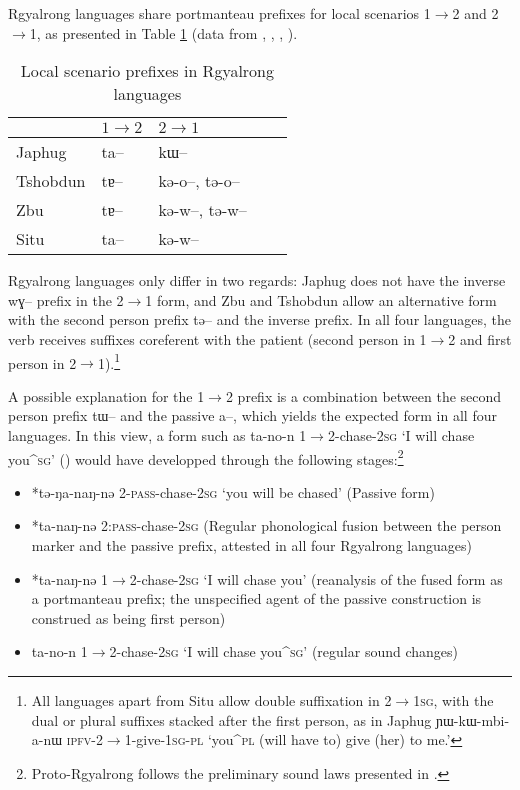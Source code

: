 \documentclass[oldfontcommands,oneside,a4paper,11pt]{article}
\newcommand{\ipa}[1]{{\phon \mbox{#1}}} %
\begin{document}
Rgyalrong languages share portmanteau prefixes for local scenarios 1$\rightarrow$2 and 2$\rightarrow$1, as presented in Table \ref{tab:local.rgy} (data from \citealt[218]{linxr93jiarong}, \citealt{jackson02rentongdengdi}, \citealt{jacques12agreement}, \citealt{gongxun14agreement}).

\begin{table}
\caption{Local scenario prefixes in Rgyalrong languages} \centering \label{tab:local.rgy} 
\begin{tabular}{lllll}
\toprule
& $1\rightarrow2$ & $2\rightarrow1$ \\
\midrule
Japhug &  \ipa{ta--} & \ipa{kɯ--} \\
Tshobdun &  \ipa{tɐ--} & \ipa{kə-o--}, \ipa{tə-o--} \\
Zbu &  \ipa{tɐ--} &\ipa{kə-w--}, \ipa{tə-w--} \\
Situ &  \ipa{ta--} & \ipa{kə-w--} \\
\bottomrule
\end{tabular}
\end{table}

Rgyalrong languages only differ in two regards: Japhug does not have the inverse \ipa{wɣ--} prefix in the  2$\rightarrow$1 form, and Zbu and Tshobdun allow an alternative form with the second person prefix \ipa{tə--} and the inverse prefix. In all four languages, the verb receives suffixes coreferent with the patient (second person in 1$\rightarrow$2 and first person in  2$\rightarrow$1).\footnote{All languages apart from Situ allow double suffixation in 2$\rightarrow$\textsc{1sg}, with the dual or plural suffixes stacked after the first person, as in Japhug \ipa{ɲɯ-kɯ-mbi-a-nɯ} \textsc{ipfv}-2$\rightarrow$1-give-\textsc{1sg-pl} `you^{\textsc{pl}} (will have to) give (her) to me.'}

A possible explanation for the 1$\rightarrow$2  prefix is a combination between the second person prefix \ipa{tɯ--} and the passive \ipa{a--}, which yields the expected form in all four languages. In this view, a form such as \ipa{ta-no-n} 1$\rightarrow$2-chase-\textsc{2sg} `I will chase you^{\textsc{sg}}' (\citealt[219]{linxr93jiarong}) would have developped through the following stages:\footnote{Proto-Rgyalrong follows the preliminary sound laws presented in \citet{jacques04these}.}

\begin{itemize}
\item *\ipa{tə-ŋa-naŋ-nə}  2-\textsc{pass}-chase-\textsc{2sg} `you will be chased' (Passive form)
\item *\ipa{ta-naŋ-nə}  2:\textsc{pass}-chase-\textsc{2sg} (Regular phonological fusion between the person marker and the passive prefix, attested in all four Rgyalrong languages)  
\item  *\ipa{ta-naŋ-nə}  1$\rightarrow$2-chase-\textsc{2sg} `I will chase you' (reanalysis of the fused form as a portmanteau prefix; the unspecified agent of the passive construction is construed as being first person)
\item  \ipa{ta-no-n} 1$\rightarrow$2-chase-\textsc{2sg} `I will chase you^{\textsc{sg}}' (regular sound changes)
\end{itemize}
\end{document}
